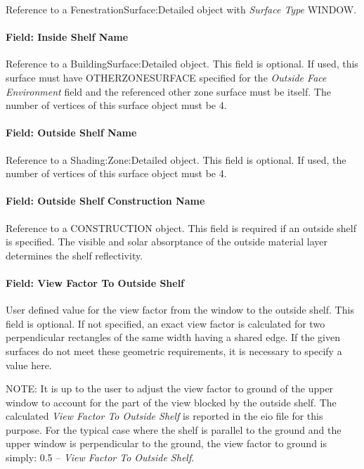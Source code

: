 Reference to a FenestrationSurface:Detailed object with \emph{Surface Type} WINDOW.

\paragraph{Field: Inside Shelf Name}\label{field-inside-shelf-name}

Reference to a BuildingSurface:Detailed object. This field is optional. If used, this surface must have OTHERZONESURFACE specified for the \emph{Outside Face Environment} field and the referenced other zone surface must be itself. The number of vertices of this surface object must be 4.

\paragraph{Field: Outside Shelf Name}\label{field-outside-shelf-name}

Reference to a Shading:Zone:Detailed object. This field is optional. If used, the number of vertices of this surface object must be 4.

\paragraph{Field: Outside Shelf Construction Name}\label{field-outside-shelf-construction-name}

Reference to a CONSTRUCTION object. This field is required if an outside shelf is specified. The visible and solar absorptance of the outside material layer determines the shelf reflectivity.

\paragraph{Field: View Factor To Outside Shelf}\label{field-view-factor-to-outside-shelf}

User defined value for the view factor from the window to the outside shelf. This field is optional. If not specified, an exact view factor is calculated for two perpendicular rectangles of the same width having a shared edge. If the given surfaces do not meet these geometric requirements, it is necessary to specify a value here.

\begin{callout}
  NOTE: It is up to the user to adjust the view factor to ground of the upper window to account for the part of the view blocked by the outside shelf. The calculated \emph{View Factor To Outside Shelf} is reported in the eio file for this purpose. For the typical case where the shelf is parallel to the ground and the upper window is perpendicular to the ground, the view factor to ground is simply: 0.5 -- \emph{View Factor To Outside Shelf}.
\end{callout}

